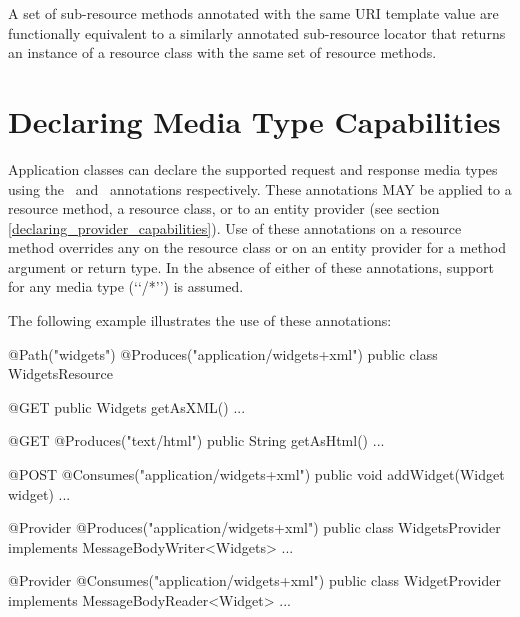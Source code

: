 \begin{nnnote}A set of sub-resource methods annotated with the same URI template value are functionally equivalent to a similarly annotated sub-resource locator that returns an instance of a resource class with the same set of resource methods.\end{nnnote}

\section{Declaring Media Type Capabilities}
\label{declaring_method_capabilities}

Application classes can declare the supported request and response media types using the \Consumes\ and \Produces\ annotations respectively. These annotations MAY be applied to a resource method, a resource class, or to an entity provider (see section \ref{declaring_provider_capabilities}). Use of these annotations on a resource method overrides any on the resource class or on an entity provider for a method argument or return type. In the absence of either of these annotations, support for any media type (\lq\lq*/*\rq\rq) is assumed.

The following example illustrates the use of these annotations:

\begin{listing}{1}
@Path("widgets")
@Produces("application/widgets+xml")
public class WidgetsResource {
  
  @GET
  public Widgets getAsXML() {...}
  
  @GET
  @Produces("text/html")
  public String getAsHtml() {...}
  
  @POST
  @Consumes("application/widgets+xml")
  public void addWidget(Widget widget) {...}
}

@Provider
@Produces("application/widgets+xml")
public class WidgetsProvider implements MessageBodyWriter<Widgets> {...}

@Provider
@Consumes("application/widgets+xml")
public class WidgetProvider implements MessageBodyReader<Widget> {...}
\end{listing}

